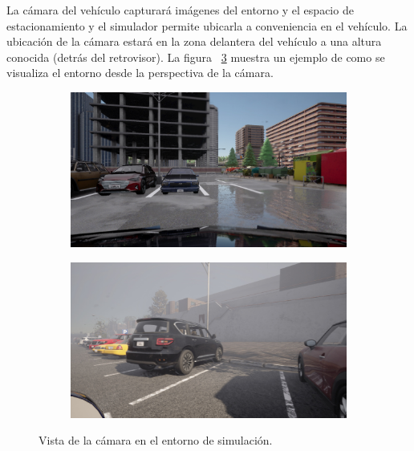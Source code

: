 \noindent
La cámara del vehículo capturará imágenes del entorno y el espacio de estacionamiento y el simulador permite ubicarla a conveniencia en el vehículo.
La ubicación de la cámara estará en la zona delantera del vehículo a una altura conocida (detrás del retrovisor).
La figura ~\ref{fig:camera-view} muestra un ejemplo de como se visualiza el entorno desde la perspectiva de la cámara.

\begin{figure}[!ht]
    \centering
    \begin{subfigure}{0.4\textwidth}
        \includegraphics[width=\textwidth]{img/mirrow_camara_ex}\label {fig:camara}
    \end{subfigure}
    \begin{subfigure}{0.4\textwidth}
        \includegraphics[width=\textwidth]{img/mirrow_camara_ex2}\label {fig:camara2}
    \end{subfigure}
    \caption{Vista de la cámara en el entorno de simulación.}
    \label{fig:camera-view}
\end{figure}





